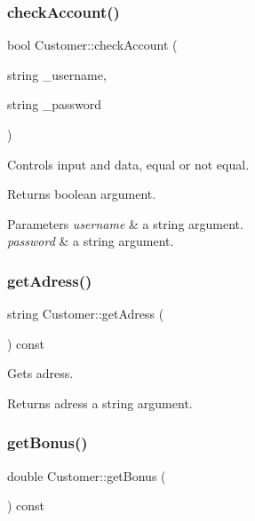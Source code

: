 \subsubsection{\texorpdfstring{check\+Account()}{checkAccount()}}
{\footnotesize\ttfamily bool Customer\+::check\+Account (\begin{DoxyParamCaption}\item[{string}]{\+\_\+username,  }\item[{string}]{\+\_\+password }\end{DoxyParamCaption})}



Controls input and data, equal or not equal. 

\begin{DoxyReturn}{Returns}
boolean argument. 
\end{DoxyReturn}

\begin{DoxyParams}{Parameters}
{\em username} & a string argument. \\
\hline
{\em password} & a string argument. \\
\hline
\end{DoxyParams}
\mbox{\label{classCustomer_a2b0f5ddbc9e4730da690e8cd6391e16e}} 
\subsubsection{\texorpdfstring{get\+Adress()}{getAdress()}}
{\footnotesize\ttfamily string Customer\+::get\+Adress (\begin{DoxyParamCaption}{ }\end{DoxyParamCaption}) const}



Gets adress. 

\begin{DoxyReturn}{Returns}
adress a string argument. 
\end{DoxyReturn}
\mbox{\label{classCustomer_ab4db4b8214793eaf6ddc8597ac8daf1b}} 
\subsubsection{\texorpdfstring{get\+Bonus()}{getBonus()}}
{\footnotesize\ttfamily double Customer\+::get\+Bonus (\begin{DoxyParamCaption}{ }\end{DoxyParamCaption}) const}



